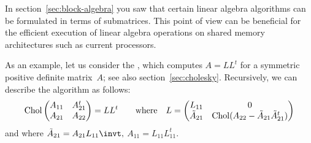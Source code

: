 In section~\ref{sec:block-algebra} you saw that certain linear algebra
algorithms can be formulated in terms of submatrices. This point of
view can be beneficial for the efficient execution of linear algebra
operations on shared memory architectures such as current
 processors.

\newcommand\chol{\mathop{\mathrm{Chol}}}
As an example, let us consider the ,
which computes $A=LL^t$ for a symmetric positive definite matrix~$A$;
see also section~\ref{sec:cholesky}.
Recursively, we can describe the algorithm as follows:
\[ \chol
\begin{pmatrix}
  A_{11}&A_{21}^t\\ A_{21}&A_{22}
\end{pmatrix} = LL^t\qquad\hbox{where}\quad L=
\begin{pmatrix}
  L_{11}&0\\ \tilde A_{21} &\chol(A_{22}-\tilde A_{21}\tilde A_{21}^t)
\end{pmatrix}
\]
and where $\tilde A_{21}=A_{21}L_{11}\invt,$ $A_{11}=L_{11}L_{11}^t$.

